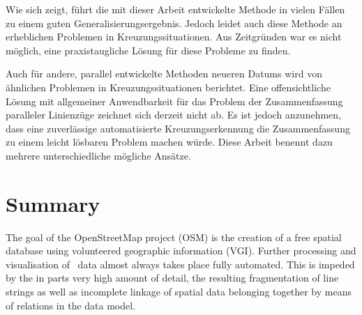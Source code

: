 \documentclass[../main/thesis.tex]{subfiles}
\begin{document}
Wie sich zeigt, führt die mit dieser Arbeit entwickelte Methode in vielen Fällen zu einem guten Generalisierungsergebnis.
Jedoch leidet auch diese Methode an erheblichen Problemen in Kreuzungssituationen.
Aus Zeitgründen war es nicht möglich, eine praxistaugliche Lösung für diese Probleme zu finden.


Auch für andere, parallel entwickelte Methoden neueren Datums wird von ähnlichen Problemen in Kreuzungssituationen berichtet.
Eine offensichtliche Lösung mit allgemeiner Anwendbarkeit für das Problem der Zusammenfassung paralleler Linienzüge zeichnet sich derzeit nicht ab.
Es ist jedoch anzunehmen, dass eine zuverlässige automatisierte Kreuzungserkennung die Zusammenfassung zu einem leicht lösbaren Problem machen würde.
Diese Arbeit benennt dazu mehrere unterschiedliche mögliche Ansätze.






\chapter*{Summary}

The goal of the OpenStreetMap project (OSM) is the creation of a free spatial database using volunteered geographic information (VGI).
Further processing and visualisation of \osm\ data almost always takes place fully automated.
This is impeded by the in parts very high amount of detail, the resulting fragmentation of line strings as well as incomplete linkage of spatial data belonging together by means of relations in the data model.
\end{document}
